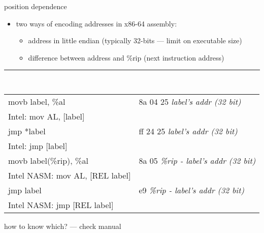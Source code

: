 \begin{frame}[fragile,label=picVNot]{position dependence}
\begin{itemize}
\item two ways of encoding addresses in x86-64 assembly:
    \begin{itemize}
    \item address in little endian (typically 32-bits --- limit on executable size)
    \item difference between address and \%rip (next instruction address)
    \end{itemize}
\end{itemize}
\hrule
{\tt
\begin{tabular}{l|l}
movb label, \%al & 8a 04 25 {\normalfont\it label's addr (32 bit)} \\
{\small {\normalfont Intel:} mov AL, [label]} \\
jmp *label & ff 24 25 {\normalfont\it label's addr (32 bit)} \\
{\small {\normalfont Intel:} jmp [label]} \\
movb label(\%rip), \%al & 8a 05 {\normalfont\it \%rip - label's addr (32 bit)} \\
{\small {\normalfont Intel NASM:} mov AL, [REL label] } \\
jmp label & e9 {\normalfont\it \%rip - label's addr (32 bit)} \\
{\small {\normalfont Intel NASM:} jmp [REL label]} \\
\end{tabular}
}
how to know which? --- check manual
\end{frame}
